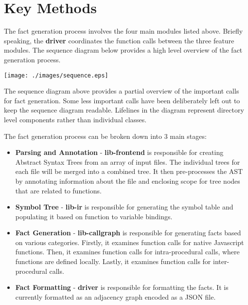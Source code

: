 \section{Key Methods}

The fact generation process involves the four main modules listed above. Briefly speaking, the \textbf{driver} coordinates the function calls between the three feature modules. The sequence diagram below provides a high level overview of the fact generation process. 

\begin{center}
\texttt{[image: ./images/sequence.eps]}
\end{center}

The sequence diagram above provides a partial overview of the important calls for fact generation. Some less important calls have been deliberately left out to keep the sequence diagram readable. Lifelines in the diagram represent directory level components rather than individual classes.

The fact generation process can be broken down into 3 main stages:

\begin{itemize}
    \item \textbf{Parsing and Annotation} - \textbf{lib-frontend} is responsible for creating Abstract Syntax Trees from an array of input files. The individual trees for each file will be merged into a combined tree. It then pre-processes the AST by annotating information about the file and enclosing scope for tree nodes that are related to functions. 
    \item \textbf{Symbol Tree} - \textbf{lib-ir} is responsible for generating the symbol table and populating it based on function to variable bindings.
    \item \textbf{Fact Generation} - \textbf{lib-callgraph} is responsible for generating facts based on various categories. Firstly, it examines function calls for native Javascript functions. Then, it examines function calls for intra-procedural calls, where functions are defined locally. Lastly, it examines function calls for inter-procedural calls.
    \item \textbf{Fact Formatting} - \textbf{driver} is responsible for formatting the facts. It is currently formatted as an adjacency graph encoded as a JSON file.
\end{itemize}

